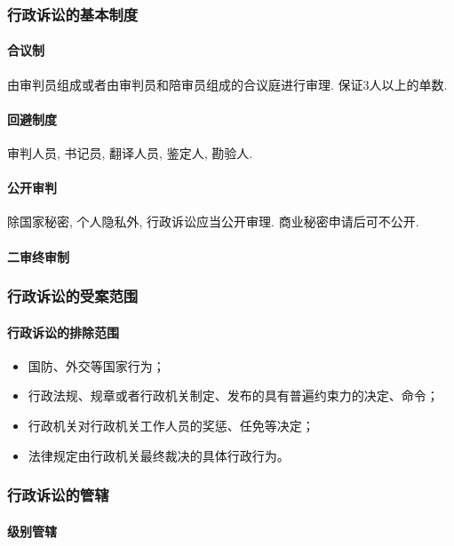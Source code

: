 \subsubsection{行政诉讼的基本制度}

\paragraph{合议制} 由审判员组成或者由审判员和陪审员组成的合议庭进行审理. 保证3人以上的单数.

\paragraph{回避制度} 审判人员, 书记员, 翻译人员, 鉴定人, 勘验人.

\paragraph{公开审判} 除国家秘密, 个人隐私外, 行政诉讼应当公开审理. 商业秘密申请后可不公开.

\paragraph{二审终审制}

\subsubsection{行政诉讼的受案范围}

\paragraph{行政诉讼的排除范围}

\begin{itemize}
	\item 国防、外交等国家行为；
	\item 行政法规、规章或者行政机关制定、发布的具有普遍约束力的决定、命令；
	\item 行政机关对行政机关工作人员的奖惩、任免等决定；
	\item 法律规定由行政机关最终裁决的具体行政行为。
\end{itemize}

\subsubsection{行政诉讼的管辖}

\paragraph{级别管辖}

